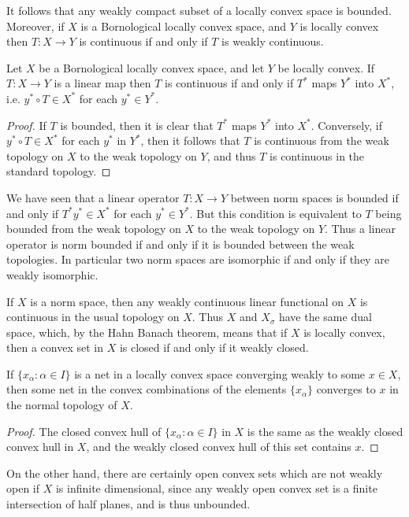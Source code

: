 It follows that any weakly compact subset of a locally convex space is bounded. Moreover, if $X$ is a Bornological locally convex space, and $Y$ is locally convex then $T: X \to Y$ is continuous if and only if $T$ is weakly continuous.

\begin{corollary}
    Let $X$ be a Bornological locally convex space, and let $Y$ be locally convex. If $T: X \to Y$ is a linear map then $T$ is continuous if and only if $T^*$ maps $Y^*$ into $X^*$, i.e. $y^* \circ T \in X^*$ for each $y^* \in Y^*$.
\end{corollary}
\begin{proof}
    If $T$ is bounded, then it is clear that $T^*$ maps $Y^*$ into $X^*$. Conversely, if $y^* \circ T \in X^*$ for each $y^*$ in $Y^*$, then it follows that $T$ is continuous from the weak topology on $X$ to the weak topology on $Y$, and thus $T$ is continuous in the standard topology.
\end{proof}

We have seen that a linear operator $T: X \to Y$ between norm spaces is bounded if and only if $T^* y^* \in X^*$ for each $y^* \in Y^*$. But this condition is equivalent to $T$ being bounded from the weak topology on $X$ to the weak topology on $Y$. Thus a linear operator is norm bounded if and only if it is bounded between the weak topologies. In particular two norm spaces are isomorphic if and only if they are weakly isomorphic.

If $X$ is a norm space, then any weakly continuous linear functional on $X$ is continuous in the usual topology on $X$. Thus $X$ and $X_\sigma$ have the same dual space, which, by the Hahn Banach theorem, means that if $X$ is locally convex, then a convex set in $X$ is closed if and only if it weakly closed. 

\begin{theorem}
    If $\{ x_\alpha : \alpha \in I \}$ is a net in a locally convex space converging weakly to some $x \in X$, then some net in the convex combinations of the elements $\{ x_\alpha \}$ converges to $x$ in the normal topology of $X$.
\end{theorem}
\begin{proof}
    The closed convex hull of $\{ x_\alpha : \alpha \in I \}$ in $X$ is the same as the weakly closed convex hull in $X$, and the weakly closed convex hull of this set contains $x$.
\end{proof}

On the other hand, there are certainly open convex sets which are not weakly open if $X$ is infinite dimensional, since any weakly open convex set is a finite intersection of half planes, and is thus unbounded.

